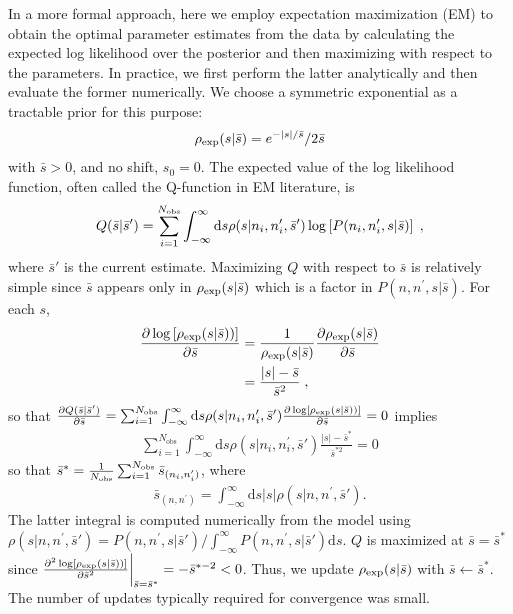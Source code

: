 In a more formal approach, here we employ expectation maximization (EM) to obtain the optimal parameter estimates from the data by calculating the expected log likelihood over the posterior and then maximizing with respect to the parameters. In practice, we first perform the latter analytically and then evaluate the former numerically. We choose a symmetric exponential as a tractable prior for this purpose:
\begin{align}
	\rho_{\rm exp}(s|\bar{s})=e^{-|s|/\bar{s}}/2\bar{s}
\end{align}
with $\bar{s}>0$, and no shift, $s_0=0$. The expected value of the log likelihood function, often called the Q-function in EM literature, is 
 \begin{align}
 Q(\bar{s}|\bar{s}')=\sum_{i=1}^{N_\textrm{\textrm{obs}}}\int_{-\infty}^{\infty}\mathrm{d}s\rho(s|n_i,n_i^{\prime},\bar{s}')\log \left[P(n_i,n_i^{\prime},s|\bar{s})\right]\;,
 \end{align}
 where $\bar{s}'$ is the current estimate.
 Maximizing $Q$  with respect to $\bar{s}$ is relatively simple since $\bar{s}$ appears only in $\rho_{\rm exp}(s|\bar{s})$  which is a factor in $P(n,n^{\prime},s|\bar{s})$. For each $s$,
 \begin{align}
 \frac{\partial \log \left[\rho_{\rm exp}(s|\bar{s}))\right] }{\partial\bar{s}} &=\frac{1}{\rho_{\rm exp}(s|\bar{s})} \frac{\partial\rho_{\rm exp}(s|\bar{s})}{\partial\bar{s}}\\&=\frac{|s|-\bar{s}}{\bar{s}^2}\;,
 \end{align}
so that $  \frac{\partial Q(\bar{s}|\bar{s}')}{\partial\bar{s}}=\sum_{i=1}^{N_\textrm{obs}}\int_{-\infty}^{\infty}\mathrm{d}s\rho(s|n_i,n_i^{\prime},\bar{s}')\frac{\partial \log \left[\rho_{\rm exp}(s|\bar{s}))\right] }{\partial\bar{s}} =0$ implies
\begin{align}
  \sum_{i=1}^{N_\textrm{obs}}\int_{-\infty}^{\infty}\mathrm{d}s\rho(s|n_i,n_i^{\prime},\bar{s}')\frac{|s|-\bar{s}^*}{\bar{s}^{*2}} =0
\end{align}
so that $\bar{s}^*=\frac{1}{N_\textrm{\textrm{obs}}}\sum_{i=1}^{N_\textrm{obs}}\bar{s}_{(n_i,n_i^{\prime})}$, where 
\begin{align}
\bar{s}_{(n,n^{\prime})}=\int_{-\infty}^{\infty}\mathrm{d}s|s|\rho(s|n,n^{\prime},\bar{s}').
\end{align}
The latter integral is computed numerically from the model using $\rho(s|n,n^{\prime},\bar{s}')=P(n,n^{\prime},s|\bar{s}')/\int_{-\infty}^{\infty}P(n,n^{\prime},s|\bar{s}')\mathrm{d}s	$. $Q$ is maximized at $\bar{s}=\bar{s}^*$ since  $ \frac{\partial^2 \log \left[\rho_{\rm exp}(s|\bar{s}))\right] }{\partial\bar{s}^2}\bigg|_{\bar{s}=\bar{s}^*}=-\bar{s}^{*-2} <0$. Thus, we update $\rho_{\rm exp}(s|\bar{s})$ with 
$\bar s\leftarrow\bar{s}^*$.
The number of updates typically required for convergence was small.

